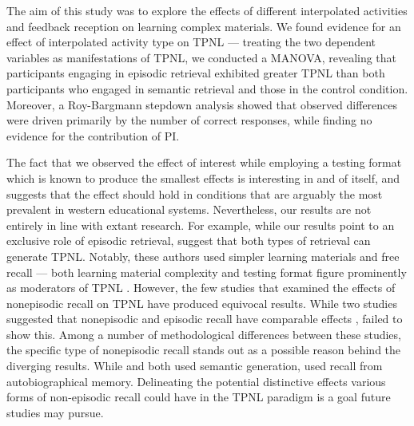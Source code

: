\documentclass[../main.tex]{subfiles}
\begin{document}
The aim of this study was to explore the effects of different interpolated 
activities and feedback reception on learning complex materials. We found 
evidence for an effect of interpolated activity type on TPNL — treating the 
two dependent variables as manifestations of TPNL, we conducted a MANOVA, 
revealing that participants engaging in episodic retrieval exhibited greater 
TPNL than both participants who engaged in semantic retrieval and those in 
the control condition. Moreover, a Roy-Bargmann stepdown analysis showed 
that observed differences were driven primarily by the number of correct 
responses, while finding no evidence for the contribution of PI.

The fact that we observed the effect of interest while employing a testing 
format which is known to produce the smallest effects is interesting in and 
of itself, and suggests that the effect should hold in conditions that are 
arguably the most prevalent in western educational systems. Nevertheless, 
our results are not entirely in line with extant research. For example, 
while our results point to an exclusive role of 
episodic retrieval, \cite{pastotterRetrievalLearningFacilitates2011} suggest 
that both types of retrieval can generate TPNL. Notably, these authors used 
simpler learning materials and free recall — both learning material 
complexity and testing format figure prominently as moderators of TPNL 
\citep{chanRetrievalPotentiatesNew2018}. However, the few studies that 
examined the effects of nonepisodic recall on TPNL have produced equivocal 
results. While two studies suggested that nonepisodic and episodic recall 
have comparable effects \citep{divisRetrievalSpeedsContext2014, 
pastotterRetrievalLearningFacilitates2011}, 
\cite{weinsteinNotAllRetrieval2015} failed to show this. Among a number of 
methodological differences between these studies, the specific type of 
nonepisodic recall stands out as a possible reason behind the diverging 
results. While \cite{pastotterRetrievalLearningFacilitates2011} and 
\cite{divisRetrievalSpeedsContext2014} both used semantic generation, 
\cite{weinsteinNotAllRetrieval2015} used recall from autobiographical 
memory. Delineating the potential distinctive effects various forms of 
non-episodic recall could have in the TPNL paradigm is a goal future studies 
may pursue.
\end{document}
